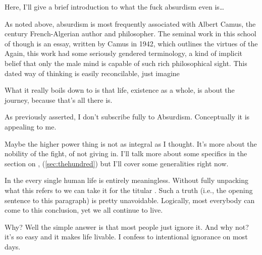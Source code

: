 \documentclass[../butidigress.tex]{subfiles}
\begin{document}
\entryskip

Here, I'll give a brief introduction to what the fuck absurdism even is\ldots{}

As noted above, absurdism is most frequently associated with Albert Camus, the  century French-Algerian author and philosopher.
The seminal work in this school of though is  an essay, written by Camus in 1942, which outlines the virtues of the 
Again, this work had some seriously gendered terminology, a kind of implicit belief that only the male mind is capable of such rich philosophical sight.
This dated way of thinking is easily reconcilable, just imagine 

What it really boils down to is that life, existence as a whole, is about the journey, because that's all there is.\autocite{mythofsisyphus}

As previously asserted, I don't subscribe fully to Absurdism.
Conceptually it is appealing to me.

Maybe the higher power thing is not as integral as I thought.
It's more about the nobility of the fight, of not giving in.
I'll talk more about some specifics in the section on , (\ref{sec:thehundred}) but I'll cover some generalities right now.


In the  every single human life is entirely meaningless. Without fully unpacking what  this refers to we can take it for the titular . Such a truth (i.e., the opening sentence to this paragraph) is pretty unavoidable. Logically, most everybody can come to this conclusion, yet we all continue to live.\par Why? Well the simple answer is that most people just ignore it. And why not? it's so easy and it makes life livable. I confess to intentional ignorance on most days.
\end{document}
